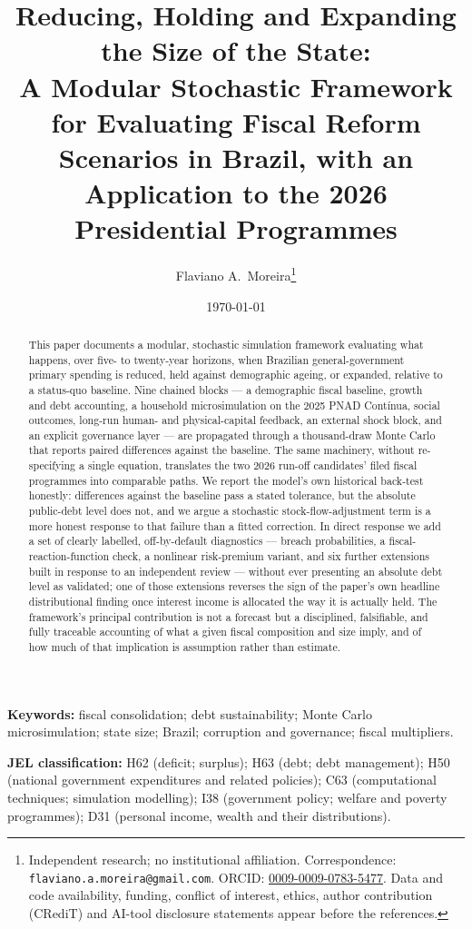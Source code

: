 \documentclass[11pt,a4paper]{article}
\title{\textbf{Reducing, Holding and Expanding the Size of the State: \\
A Modular Stochastic Framework for Evaluating Fiscal Reform Scenarios in Brazil, with an Application to the 2026 Presidential Programmes}}
\author{Flaviano A.\ Moreira\thanks{Independent research; no institutional affiliation. Correspondence: \texttt{flaviano.a.moreira@gmail.com}. ORCID: \href{https://orcid.org/0009-0009-0783-5477}{0009-0009-0783-5477}. Data and code availability, funding, conflict of interest, ethics, author contribution (CRediT) and AI-tool disclosure statements appear before the references.}}
\date{\today}
\begin{document}
\maketitle

\begin{abstract}
\noindent This paper documents a modular, stochastic simulation framework evaluating what happens, over five- to twenty-year horizons, when Brazilian general-government primary spending is reduced, held against demographic ageing, or expanded, relative to a status-quo baseline. Nine chained blocks --- a demographic fiscal baseline, growth and debt accounting, a household microsimulation on the 2025 PNAD Cont\'inua, social outcomes, long-run human- and physical-capital feedback, an external shock block, and an explicit governance layer --- are propagated through a thousand-draw Monte Carlo that reports paired differences against the baseline. The same machinery, without re-specifying a single equation, translates the two 2026 run-off candidates' filed fiscal programmes into comparable paths. We report the model's own historical back-test honestly: differences against the baseline pass a stated tolerance, but the absolute public-debt level does not, and we argue a stochastic stock-flow-adjustment term is a more honest response to that failure than a fitted correction. In direct response we add a set of clearly labelled, off-by-default diagnostics --- breach probabilities, a fiscal-reaction-function check, a nonlinear risk-premium variant, and six further extensions built in response to an independent review --- without ever presenting an absolute debt level as validated; one of those extensions reverses the sign of the paper's own headline distributional finding once interest income is allocated the way it is actually held. The framework's principal contribution is not a forecast but a disciplined, falsifiable, and fully traceable accounting of what a given fiscal composition and size imply, and of how much of that implication is assumption rather than estimate.
\end{abstract}

\noindent\textbf{Keywords:} fiscal consolidation; debt sustainability; Monte Carlo microsimulation; state size; Brazil; corruption and governance; fiscal multipliers.

\noindent\textbf{JEL classification:} H62 (deficit; surplus); H63 (debt; debt management); H50 (national government expenditures and related policies); C63 (computational techniques; simulation modelling); I38 (government policy; welfare and poverty programmes); D31 (personal income, wealth and their distributions).
\end{document}
